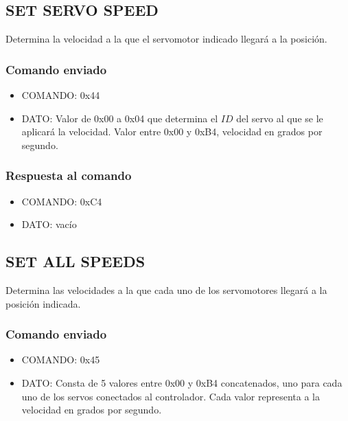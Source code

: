 \documentclass[a4paper,10pt]{article}
\begin{document}
\subsection{SET SERVO SPEED}
\label{set_servo_speed}

Determina la velocidad a la que el servomotor indicado llegar\'a a la posici\'on.

\subsubsection*{Comando enviado}

\begin{itemize}
	\item{COMANDO:} 0x44
	\item{DATO:} Valor de 0x00 a 0x04 que determina el $ID$ del servo al que se le aplicar\'a la velocidad.
	Valor entre 0x00 y 0xB4, velocidad en grados por segundo.
\end{itemize}

\subsubsection*{Respuesta al comando}

\begin{itemize}
	\item{COMANDO:} 0xC4
	\item{DATO:} vac\'io
\end{itemize}

\subsection{SET ALL SPEEDS}
\label{set_all_speeds}

Determina las velocidades a la que cada uno de los servomotores llegar\'a a la posici\'on indicada.

\subsubsection*{Comando enviado}

\begin{itemize}
	\item{COMANDO:} 0x45
	\item{DATO:} Consta de 5 valores entre 0x00 y 0xB4 concatenados, uno para cada uno de los servos conectados al controlador.
	Cada valor representa a la velocidad en grados por segundo.
\end{itemize}
\end{document}
